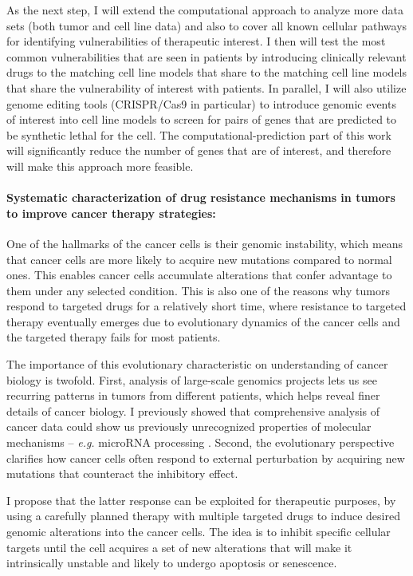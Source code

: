 \documentclass[11pt,letterpaper]{article}
\begin{document}
As the next step, I will extend the computational approach to analyze more data sets (both tumor and cell line data) and also to cover all known cellular pathways for identifying vulnerabilities of therapeutic interest.
I then will test the most common vulnerabilities that are seen in patients by introducing clinically relevant drugs to the matching cell line models that share to the matching cell line models that share the vulnerability of interest with patients.
In parallel, I will also utilize genome editing tools (CRISPR/Cas9 in particular)
to introduce genomic events of interest into cell line models to screen for pairs of genes that are predicted to be synthetic lethal for the cell.
The computational-prediction part of this work will significantly reduce the number of genes that are of interest, 
and therefore will make this approach more feasible.

\paragraph{Systematic characterization of drug resistance mechanisms in tumors to improve cancer therapy strategies:}
One of the hallmarks of the cancer cells is their genomic instability, 
which means that cancer cells are more likely to acquire new mutations compared to normal ones.
This enables cancer cells accumulate alterations that confer advantage to them under any selected condition.
This is also one of the reasons why tumors respond to targeted drugs for a relatively short time,
where resistance to targeted therapy eventually emerges due to evolutionary dynamics of the cancer cells
and the targeted therapy fails for most patients.

The importance of this evolutionary characteristic on understanding of cancer biology is twofold.
First, analysis of large-scale genomics projects lets us see recurring patterns in tumors from different patients, which helps reveal finer details of cancer biology.
I previously showed that comprehensive analysis of cancer data could show us previously unrecognized properties of molecular mechanisms -- \textit{e.g.} microRNA processing \cite{aksoy2014cancer}.
Second, the evolutionary perspective clarifies how cancer cells often respond to external perturbation by acquiring new mutations that counteract the inhibitory effect.

I propose that the latter response can be exploited for therapeutic purposes,
by using a carefully planned therapy with multiple targeted drugs to induce desired genomic alterations into the cancer cells.
The idea is to inhibit specific cellular targets until the cell acquires a set of new alterations that will make it intrinsically unstable and likely to undergo apoptosis or senescence.
\end{document}
